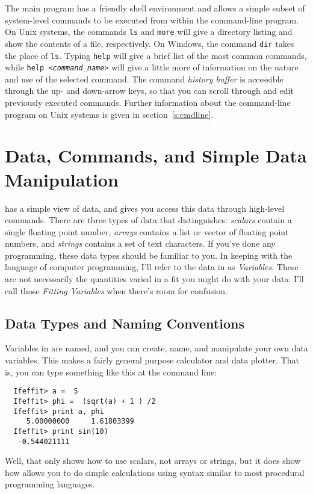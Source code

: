 \documentclass[11pt]{article}
\begin{document}
The main {\ifeffit} program has a friendly shell environment and allows a
simple subset of system-level commands to be executed from within the
command-line program.  On Unix systems, the commands {\tt{ls}} and
{\tt{more}} will give a directory listing and show the contents of a file,
respectively.  On Windows, the command {\tt{dir}} takes the place of
{\tt{ls}}.  Typing {\tt{help}} will give a brief list of the most common
commands, while {\tt{help \emph{<command\_name>}}} will give a little more
of information on the nature and use of the selected command.  The command
{\emph{history buffer}} is accessible through the up- and down-arrow keys,
so that you can scroll through and edit previously executed commands.
Further information about the command-line program on Unix systems is given
in section~{\ref{s:cmdline}}.

\clearpage
\section{Data, Commands, and Simple Data Manipulation}
\label{s:datatypes}

{\ifeffit} has a simple view of data, and gives you access this data
through high-level commands.  There are three types of data that {\ifeffit}
distinguishes: {\emph{scalars}} contain a single floating point number,
{\emph{arrays}} contains a list or vector of floating point numbers, and
{\emph{strings}} contains a set of text characters.  If you've done any
programming, these data types should be familiar to you.  In keeping with
the language of computer programming, I'll refer to the data in {\ifeffit}
as {\emph{Variables}}.  These are not necessarily the quantities varied in
a fit you might do with your data: I'll call those {\emph{Fitting
    Variables}} when there's room for confusion.

\subsection{Data Types and Naming Conventions}\label{s:datatypes:names}

Variables in {\ifeffit} are named, and you can create, name, and manipulate
your own data variables.  This makes {\ifeffit} a fairly general purpose
calculator and data plotter.  That is, you can type something like this at
the {\ifeffit} command line:

{\small\begin{verbatim}
  Ifeffit> a =  5
  Ifeffit> phi =  (sqrt(a) + 1 ) /2
  Ifeffit> print a, phi
     5.00000000     1.61803399
  Ifeffit> print sin(10)
   -0.544021111
\end{verbatim}}\noindent
Well, that only shows how to use {{scalars}}, not arrays or strings, but it
does show how {\ifeffit} allows you to do simple calculations using syntax
similar to most procedural programming languages. 
\end{document}
